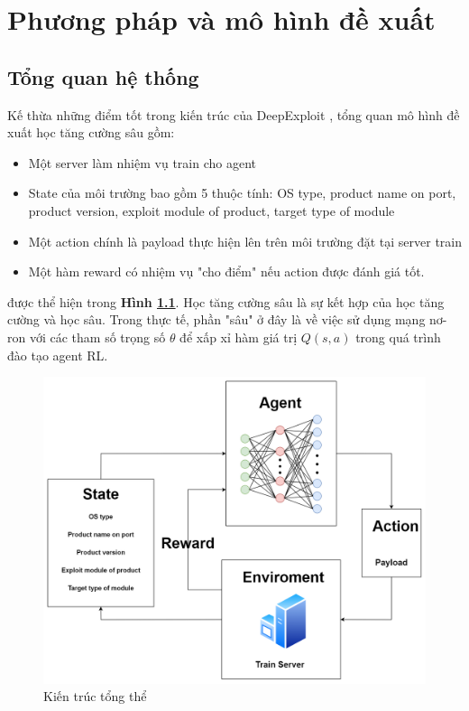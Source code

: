 \chapter{Phương pháp và mô hình đề xuất }
\label{chapter3}
\section{Tổng quan hệ thống}


Kế thừa những điểm tốt trong kiến trúc của DeepExploit \cite{takaesudeepexploit}, tổng quan mô hình đề xuất học tăng cường sâu gồm:

\begin{itemize}
    \item Một server làm nhiệm vụ train cho agent
    \item State của môi trường bao gồm 5 thuộc tính: OS type, product name on port, product version, exploit module of product, target type of module
    \item Một action chính là payload thực hiện lên trên môi trường đặt tại server train
    \item Một hàm reward có nhiệm vụ "cho điểm" nếu action được đánh giá tốt.
\end{itemize}
được thể hiện trong \textbf{Hình \ref{fig:chap3-rlauto-pentest}}. Học tăng cường sâu là sự kết hợp của học tăng cường và học sâu. Trong thực tế, phần "sâu" ở đây là về việc sử dụng mạng nơ-ron với các tham số trọng số $\theta$ để xấp xỉ hàm giá trị $Q(s, a)$ trong quá trình đào tạo agent RL.

\begin{figure}[!h]
    \centering
    \includegraphics[scale=0.3]{graphics/chapter-3/chap3-rlauto-pentest.png}
    \caption{Kiến trúc tổng thể }
    \label{fig:chap3-rlauto-pentest}
\end{figure}


